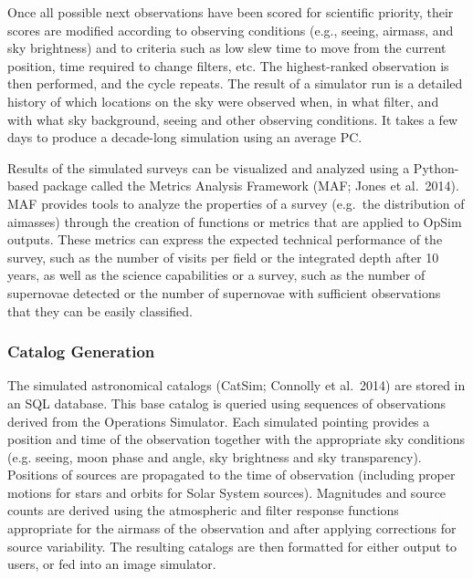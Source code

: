 {Once all possible next observations have been scored for scientific
priority, their scores are modified according to observing conditions
(e.g., seeing, airmass, and sky brightness) and to criteria such as
low slew time to move from the current position, time required to
change filters, etc. The highest-ranked observation is then performed,
and the cycle repeats. The result of a simulator run is a detailed
history of which locations on the sky were observed when, in what
filter, and with what sky background, seeing and other observing
conditions.  It takes a few days to produce a decade-long simulation
using an average PC.

Results of the simulated surveys can be visualized and analyzed using
a Python-based package called the Metrics Analysis Framework (MAF;
Jones et al.~2014). MAF provides tools to analyze the properties of a
survey (e.g.\ the distribution of aimasses) through the creation of
functions or metrics that are applied to OpSim outputs. These metrics
can express the expected technical performance of the survey, such as
the number of visits per field or the integrated depth after 10 years,
as well as the science capabilities or a survey, such as the number of
supernovae detected or the number of supernovae with sufficient
observations that they can be easily classified.

\subsubsection{Catalog Generation}
\label{sec:catalogs}

The simulated astronomical catalogs (CatSim; Connolly et al.~2014) are
stored in an SQL database. This base catalog is queried using
sequences of observations derived from the Operations Simulator. Each
simulated pointing provides a position and time of the observation
together with the appropriate sky conditions (e.g. seeing, moon phase
and angle, sky brightness and sky transparency). Positions of sources
are propagated to the time of observation (including proper motions
for stars and orbits for Solar System sources). Magnitudes and source
counts are derived using the atmospheric and filter response functions
appropriate for the airmass of the observation and after applying
corrections for source variability.  The resulting catalogs are then
formatted for either output to users, or fed into an image
simulator.

}
